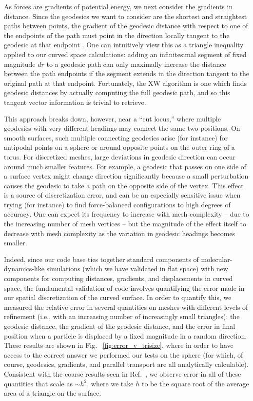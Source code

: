\documentclass[preprint,12pt]{elsarticle}
\begin{document}
As forces are gradients of potential energy, we next consider the gradients in distance.
Since the geodesics we want to consider are the shortest and straightest paths between points, the gradient of the geodesic distance with respect to one of the endpoints of the path must point in the direction locally tangent to the geodesic at that endpoint \cite{needham2021visual}.
One can intuitively view this as a triangle inequality applied to our curved space calculations: adding an infinitesimal segment of fixed magnitude $dr$ to a geodesic path can only maximally increase the distance between the path endpoints if the segment extends in the direction tangent to the original path at that endpoint.
Fortunately, the XW algorithm is one which finds geodesic distances by actually computing the full geodesic path, and so this tangent vector information is trivial to retrieve.

This approach breaks down, however, near a ``cut locus,'' where multiple geodesics with very different headings may connect the same two positions.
On smooth surfaces, such multiple connecting geodesics arise (for instance) for antipodal points on a sphere or around opposite points on the outer ring of a torus.
For discretized meshes, large deviations in geodesic direction can occur around much smaller features.
For example, a geodesic  that passes on one side of a surface vertex might change direction significantly because a small perturbation causes the geodesic to take a path on the opposite side of the vertex.
This effect is a source of discretization error, and can be an especially sensitive issue when trying (for instance) to find force-balanced configurations to high degrees of accuracy. 
One can expect its frequency to increase with mesh complexity -- due to the increasing number of mesh vertices -- but the magnitude of the effect itself to decrease with mesh complexity as the variation in geodesic headings becomes smaller.

Indeed, since our code base ties together standard components of molecular-dynamics-like simulations (which we have validated in flat space) with new components for computing distances, gradients, and displacements in curved space, the fundamental validation of code involves quantifying the error made in our spatial discretization of the curved surface.
In order to quantify this, we measured the relative error in several quantities on meshes with different levels of refinement (i.e., with an increasing number of increasingly small triangles): the geodesic distance, the gradient of the geodesic distance, and the error in final position when a particle is displaced by a fixed magnitude in a random direction.
These results are shown in Fig.~ \ref{fig:error_v_trisize}, where in order to have access to the correct answer we performed our tests on the sphere (for which, of course, geodesics, gradients, and parallel transport are all  analytically calculable).
Consistent with the coarse results seen in Ref.~\cite{sharp2019vector}, we observe error in all of these quantities that scale as $\sim h^2$, where we take $h$ to be the square root of the average area of a triangle on the surface.
\end{document}
